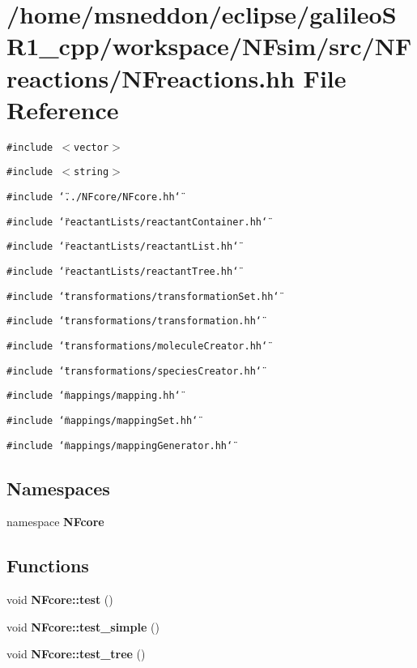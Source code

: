 \section{/home/msneddon/eclipse/galileoSR1\_\-cpp/workspace/NFsim/src/NFreactions/NFreactions.hh File Reference}
\label{NFreactions_8hh}


{\tt \#include $<$vector$>$}\par
{\tt \#include $<$string$>$}\par
{\tt \#include \char`\"{}../NFcore/NFcore.hh\char`\"{}}\par
{\tt \#include \char`\"{}reactantLists/reactantContainer.hh\char`\"{}}\par
{\tt \#include \char`\"{}reactantLists/reactantList.hh\char`\"{}}\par
{\tt \#include \char`\"{}reactantLists/reactantTree.hh\char`\"{}}\par
{\tt \#include \char`\"{}transformations/transformationSet.hh\char`\"{}}\par
{\tt \#include \char`\"{}transformations/transformation.hh\char`\"{}}\par
{\tt \#include \char`\"{}transformations/moleculeCreator.hh\char`\"{}}\par
{\tt \#include \char`\"{}transformations/speciesCreator.hh\char`\"{}}\par
{\tt \#include \char`\"{}mappings/mapping.hh\char`\"{}}\par
{\tt \#include \char`\"{}mappings/mappingSet.hh\char`\"{}}\par
{\tt \#include \char`\"{}mappings/mappingGenerator.hh\char`\"{}}\par
\subsection*{Namespaces}
\begin{CompactItemize}
\item 
namespace {\bf NFcore}
\end{CompactItemize}
\subsection*{Functions}
\begin{CompactItemize}
\item 
void {\bf NFcore::test} ()
\item 
void {\bf NFcore::test\_\-simple} ()
\item 
void {\bf NFcore::test\_\-tree} ()
\end{CompactItemize}
